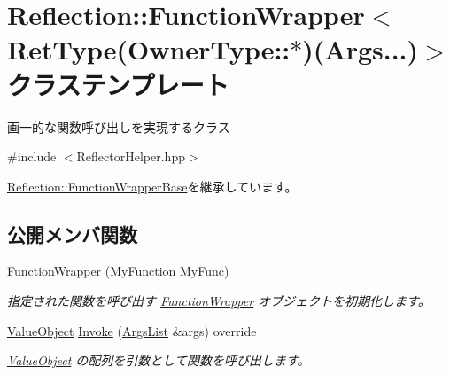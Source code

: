 \hypertarget{class_reflection_1_1_function_wrapper_3_01_ret_type_07_owner_type_1_1_5_08_07_args_8_8_8_08_4}{}\section{Reflection\+:\+:Function\+Wrapper$<$ Ret\+Type(Owner\+Type\+:\+:$\ast$)(Args...)$>$ クラステンプレート}
\label{class_reflection_1_1_function_wrapper_3_01_ret_type_07_owner_type_1_1_5_08_07_args_8_8_8_08_4}


画一的な関数呼び出しを実現するクラス 




{\ttfamily \#include $<$Reflector\+Helper.\+hpp$>$}



\hyperlink{class_reflection_1_1_function_wrapper_base}{Reflection\+::\+Function\+Wrapper\+Base}を継承しています。

\subsection*{公開メンバ関数}
\begin{DoxyCompactItemize}
\item 
\hyperlink{class_reflection_1_1_function_wrapper_3_01_ret_type_07_owner_type_1_1_5_08_07_args_8_8_8_08_4_ad576bd56bd167e54071a0d36d43efd57}{Function\+Wrapper} (My\+Function My\+Func)
\begin{DoxyCompactList}\small\item\em 指定された関数を呼び出す \hyperlink{class_reflection_1_1_function_wrapper}{Function\+Wrapper} オブジェクトを初期化します。\end{DoxyCompactList}\item 
\hyperlink{class_reflection_1_1_value_object}{Value\+Object} \hyperlink{class_reflection_1_1_function_wrapper_3_01_ret_type_07_owner_type_1_1_5_08_07_args_8_8_8_08_4_a24547d04f8961d2924cc02e97b1cbbe8}{Invoke} (\hyperlink{_reflector_helper_8hpp_a83512919cd42ea73553f4d173e7ace4c}{Args\+List} \&args) override
\begin{DoxyCompactList}\small\item\em \hyperlink{class_reflection_1_1_value_object}{Value\+Object} の配列を引数として関数を呼び出します。\end{DoxyCompactList}\end{DoxyCompactItemize}
